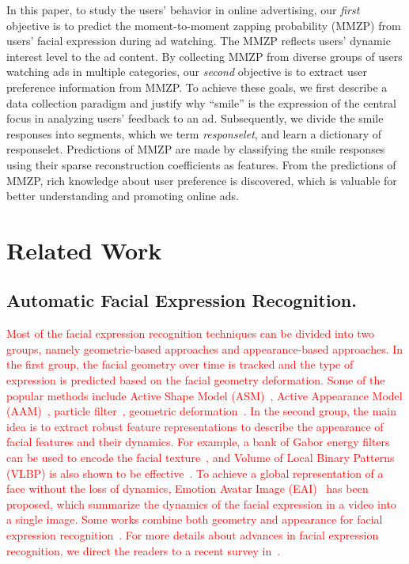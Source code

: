 \documentclass[twoside,leqno,twocolumn]{article}
\newcommand{\Songfan}[1]{\textcolor{red}{#1}}
\begin{document}
In this paper, to study the users' behavior in online advertising, our \textit{first} objective is to predict the moment-to-moment zapping probability (MMZP) from users' facial expression during ad watching. The MMZP reflects users' dynamic interest level to the ad content. By collecting MMZP from diverse groups of users watching ads in multiple categories, our \textit{second} objective is to extract user preference information from MMZP. To achieve these goals, we first describe a data collection paradigm and justify why ``smile'' is the expression of the central focus in analyzing users' feedback to an ad. Subsequently, we divide the smile responses into segments, which we term \textit{responselet}, and learn a dictionary of responselet. Predictions of MMZP are made by classifying the smile responses using their sparse reconstruction coefficients as features. From the predictions of MMZP, rich knowledge about user preference is discovered, which is valuable for better understanding and promoting online ads. 


\section{Related Work}

\subsection{Automatic Facial Expression Recognition.}

\Songfan{Most of the facial expression recognition techniques can be divided into two groups, namely geometric-based approaches and appearance-based approaches. In the first group, the facial geometry over time is tracked and the type of expression is predicted based on the facial geometry deformation. Some of the popular methods include Active Shape Model (ASM)~\cite{Hu04}, Active Appearance Model (AAM)~\cite{Lucey06}, particle filter~\cite{Valstar05}, geometric deformation~\cite{Kotsia07}. In the second group, the main idea is to extract robust feature representations to describe the appearance of facial features and their dynamics. For example, a bank of Gabor energy filters can be used to encode the facial texture~\cite{Whitehill09}, and Volume of Local Binary Patterns (VLBP) is also shown to be effective~\cite{Zhao07}. To achieve a global representation of a face without the loss of dynamics, Emotion Avatar Image (EAI)~\cite{Yang12} has been proposed, which summarize the dynamics of the facial expression in a video into a single image. Some works combine both geometry and appearance for facial expression recognition~\cite{Chen2012}. For more details about advances in facial expression recognition, we direct the readers to a recent survey in~\cite{Survey2015}.}
\end{document}
